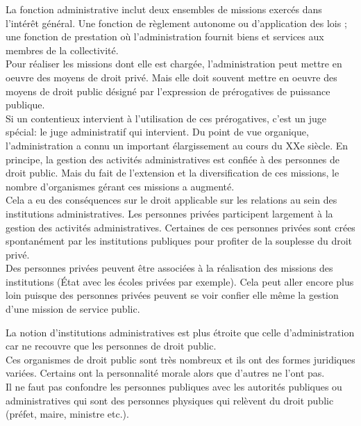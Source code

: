 \documentclass[12pt, a4paper, openany]{book}
\begin{document}
La fonction administrative inclut deux ensembles de missions exercés dans l'intérêt général. Une fonction de règlement autonome ou d'application des lois ; une fonction de prestation où l'administration fournit biens et services aux membres de la collectivité. \\
Pour réaliser les missions dont elle est chargée, l'administration peut mettre en oeuvre des moyens de droit privé. Mais elle doit souvent mettre en oeuvre des moyens de droit public désigné par l'expression de prérogatives de puissance publique. \\
Si un contentieux intervient à l'utilisation de ces prérogatives, c'est un juge spécial: le juge administratif qui intervient. Du point de vue organique, l'administration a connu un important élargissement au cours du XXe siècle. En principe, la gestion des activités administratives est confiée à des personnes de droit public. Mais du fait de l'extension et la diversification de ces missions, le nombre d'organismes gérant ces missions a augmenté. \\
Cela a eu des conséquences sur le droit applicable sur les relations au sein des institutions administratives. Les personnes privées participent largement à la gestion des activités administratives. Certaines de ces personnes privées sont crées spontanément par les institutions publiques pour profiter de la souplesse du droit privé. \\
Des personnes privées peuvent être associées à la réalisation des missions des institutions (État avec les écoles privées par exemple). Cela peut aller encore plus loin puisque des personnes privées peuvent se voir confier elle même la gestion d'une mission de service public. 


La notion d'institutions administratives est plus étroite que celle d'administration car ne recouvre que les personnes de droit public. \\
Ces organismes de droit public sont très nombreux et ils ont des formes juridiques variées. Certains ont la personnalité morale alors que d'autres ne l'ont pas. \\
Il ne faut pas confondre les personnes publiques avec les autorités publiques ou administratives qui sont des personnes physiques qui relèvent du droit public (préfet, maire, ministre etc.). 
\end{document}
